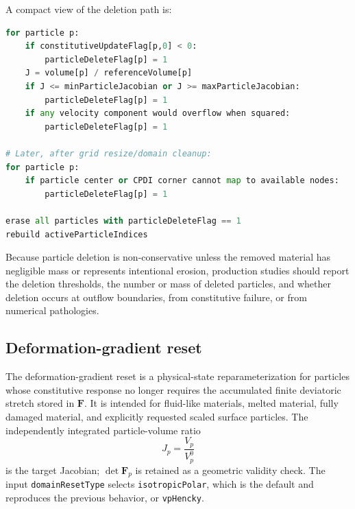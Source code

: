 A compact view of the deletion path is:
\begin{lstlisting}[language=Python,caption={Deferred particle deletion in GEOS-MPM.}]
for particle p:
    if constitutiveUpdateFlag[p,0] < 0:
        particleDeleteFlag[p] = 1
    J = volume[p] / referenceVolume[p]
    if J <= minParticleJacobian or J >= maxParticleJacobian:
        particleDeleteFlag[p] = 1
    if any velocity component would overflow when squared:
        particleDeleteFlag[p] = 1

# Later, after grid resize/domain cleanup:
for particle p:
    if particle center or CPDI corner cannot map to available nodes:
        particleDeleteFlag[p] = 1

erase all particles with particleDeleteFlag == 1
rebuild activeParticleIndices
\end{lstlisting}

Because particle deletion is non-conservative unless the removed material has negligible mass or represents intentional erosion, production studies should report the deletion thresholds, the number or mass of deleted particles, and whether deletion occurs at outflow boundaries, from constitutive failure, or from numerical pathologies.

\subsection{Deformation-gradient reset}
\label{subsec:robust-defgrad-reset}

The deformation-gradient reset is a physical-state reparameterization for particles whose constitutive response no longer requires the accumulated finite deviatoric stretch stored in $\mathbf{F}$.  It is intended for fluid-like materials, melted material, fully damaged material, and explicitly requested scaled surface particles.  The independently integrated particle-volume ratio
\begin{equation}
  J_p=\frac{V_p}{V_p^0}
  \label{eq:reset-volume-ratio}
\end{equation}
is the target Jacobian; $\det\mathbf{F}_p$ is retained as a geometric validity check.  The input \texttt{domainResetType} selects \texttt{isotropicPolar}, which is the default and reproduces the previous behavior, or \texttt{vpHencky}.

